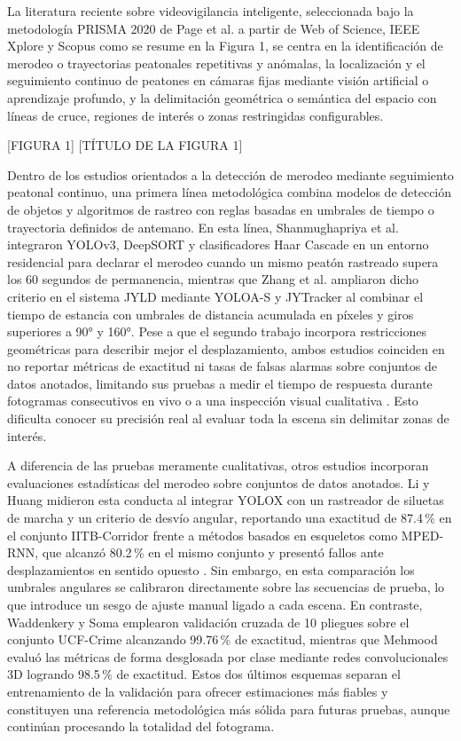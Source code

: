 \documentclass[runningheads]{llncs}
\begin{document}
La literatura reciente sobre videovigilancia inteligente, seleccionada bajo la metodología PRISMA 2020 de Page et al. \cite{page2021} a partir de Web of Science, IEEE Xplore y Scopus como se resume en la Figura 1, se centra en la identificación de merodeo o trayectorias peatonales repetitivas y anómalas, la localización y el seguimiento continuo de peatones en cámaras fijas mediante visión artificial o aprendizaje profundo, y la delimitación geométrica o semántica del espacio con líneas de cruce, regiones de interés o zonas restringidas configurables.

[FIGURA 1]
[TÍTULO DE LA FIGURA 1]

Dentro de los estudios orientados a la detección de merodeo mediante seguimiento peatonal continuo, una primera línea metodológica combina modelos de detección de objetos y algoritmos de rastreo con reglas basadas en umbrales de tiempo o trayectoria definidos de antemano. En esta línea, Shanmughapriya et al. \cite{m2022} integraron YOLOv3, DeepSORT y clasificadores Haar Cascade en un entorno residencial para declarar el merodeo cuando un mismo peatón rastreado supera los 60 segundos de permanencia, mientras que Zhang et al. \cite{zhang2023} ampliaron dicho criterio en el sistema JYLD mediante YOLOA-S y JYTracker al combinar el tiempo de estancia con umbrales de distancia acumulada en píxeles y giros superiores a 90° y 160°. Pese a que el segundo trabajo incorpora restricciones geométricas para describir mejor el desplazamiento, ambos estudios coinciden en no reportar métricas de exactitud ni tasas de falsas alarmas sobre conjuntos de datos anotados, limitando sus pruebas a medir el tiempo de respuesta durante fotogramas consecutivos en vivo \cite{m2022} o a una inspección visual cualitativa \cite{zhang2023}. Esto dificulta conocer su precisión real al evaluar toda la escena sin delimitar zonas de interés.

A diferencia de las pruebas meramente cualitativas, otros estudios incorporan evaluaciones estadísticas del merodeo sobre conjuntos de datos anotados. Li y Huang \cite{li2024} midieron esta conducta al integrar YOLOX con un rastreador de siluetas de marcha y un criterio de desvío angular, reportando una exactitud de 87.4\,\% en el conjunto IITB-Corridor frente a métodos basados en esqueletos como MPED-RNN, que alcanzó 80.2\,\% en el mismo conjunto y presentó fallos ante desplazamientos en sentido opuesto \cite{jiang2022,li2024}. Sin embargo, en esta comparación los umbrales angulares se calibraron directamente sobre las secuencias de prueba, lo que introduce un sesgo de ajuste manual ligado a cada escena. En contraste, Waddenkery y Soma \cite{waddenkery2024} emplearon validación cruzada de 10 pliegues sobre el conjunto UCF-Crime alcanzando 99.76\,\% de exactitud, mientras que Mehmood \cite{mehmood2021} evaluó las métricas de forma desglosada por clase mediante redes convolucionales 3D logrando 98.5\,\% de exactitud. Estos dos últimos esquemas separan el entrenamiento de la validación para ofrecer estimaciones más fiables y constituyen una referencia metodológica más sólida para futuras pruebas, aunque continúan procesando la totalidad del fotograma.
\end{document}

